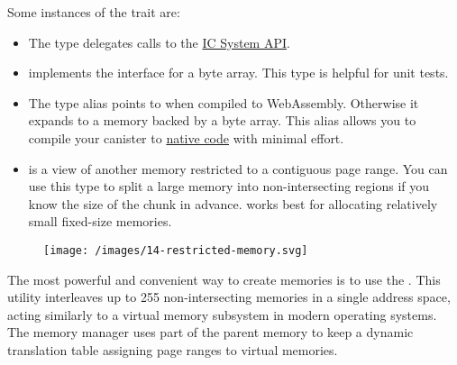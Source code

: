 \documentclass{article}
\begin{document}
Some instances of the  trait are:
\begin{itemize}
  \item
    The \href{https://github.com/dfinity/stable-structures/blob/3d22d483b9c55b79f7b869e3cf930883687d9fda/src/ic0_memory.rs}{} type delegates calls to the \href{https://internetcomputer.org/docs/current/references/ic-interface-spec#system-api-stable-memory}{IC System API}.
  \item
    \href{https://github.com/dfinity/stable-structures/blob/3d22d483b9c55b79f7b869e3cf930883687d9fda/src/vec_mem.rs#L11}{} implements the  interface for a byte array.
    This type is helpful for unit tests.
  \item
    \label{default-memory-impl}
    The \href{https://docs.rs/ic-stable-structures/latest/ic_stable_structures/type.DefaultMemoryImpl.html}{} type alias points to  when compiled to WebAssembly.
    Otherwise it expands to a memory backed by a byte array.
    This alias allows you to compile your canister to \href{/posts/01-effective-rust-canisters.html#target-independent}{native code} with minimal effort.
  \item
    \href{https://docs.rs/ic-stable-structures/latest/ic_stable_structures/struct.RestrictedMemory.html}{} is a view of another memory restricted to a contiguous page range.
    You can use this type to split a large memory into non-intersecting regions if you know the size of the chunk in advance.
     works best for allocating relatively small fixed-size memories.
\end{itemize}

\begin{figure}[grayscale-diagram]
\label{restricted-memory}
\texttt{[image: /images/14-restricted-memory.svg]}
\end{figure}

The most powerful and convenient way to create memories is to use the \href{https://docs.rs/ic-stable-structures/latest/ic_stable_structures/memory_manager/struct.MemoryManager.html}{}.
This utility interleaves up to 255 non-intersecting memories in a single address space, acting similarly to a virtual memory subsystem in modern operating systems.
The memory manager uses part of the parent memory to keep a dynamic translation table assigning page ranges to virtual memories.
\end{document}
